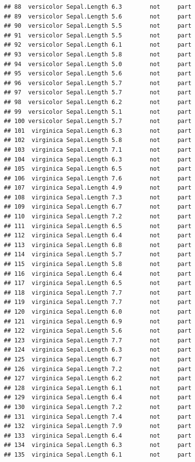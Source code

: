\documentclass[krantz2]{krantz}\usepackage{knitr}%
\begin{document}
\begin{knitrout}
\begin{kframe}
\begin{verbatim}
## 88  versicolor Sepal.Length 6.3        not     part
## 89  versicolor Sepal.Length 5.6        not     part
## 90  versicolor Sepal.Length 5.5        not     part
## 91  versicolor Sepal.Length 5.5        not     part
## 92  versicolor Sepal.Length 6.1        not     part
## 93  versicolor Sepal.Length 5.8        not     part
## 94  versicolor Sepal.Length 5.0        not     part
## 95  versicolor Sepal.Length 5.6        not     part
## 96  versicolor Sepal.Length 5.7        not     part
## 97  versicolor Sepal.Length 5.7        not     part
## 98  versicolor Sepal.Length 6.2        not     part
## 99  versicolor Sepal.Length 5.1        not     part
## 100 versicolor Sepal.Length 5.7        not     part
## 101  virginica Sepal.Length 6.3        not     part
## 102  virginica Sepal.Length 5.8        not     part
## 103  virginica Sepal.Length 7.1        not     part
## 104  virginica Sepal.Length 6.3        not     part
## 105  virginica Sepal.Length 6.5        not     part
## 106  virginica Sepal.Length 7.6        not     part
## 107  virginica Sepal.Length 4.9        not     part
## 108  virginica Sepal.Length 7.3        not     part
## 109  virginica Sepal.Length 6.7        not     part
## 110  virginica Sepal.Length 7.2        not     part
## 111  virginica Sepal.Length 6.5        not     part
## 112  virginica Sepal.Length 6.4        not     part
## 113  virginica Sepal.Length 6.8        not     part
## 114  virginica Sepal.Length 5.7        not     part
## 115  virginica Sepal.Length 5.8        not     part
## 116  virginica Sepal.Length 6.4        not     part
## 117  virginica Sepal.Length 6.5        not     part
## 118  virginica Sepal.Length 7.7        not     part
## 119  virginica Sepal.Length 7.7        not     part
## 120  virginica Sepal.Length 6.0        not     part
## 121  virginica Sepal.Length 6.9        not     part
## 122  virginica Sepal.Length 5.6        not     part
## 123  virginica Sepal.Length 7.7        not     part
## 124  virginica Sepal.Length 6.3        not     part
## 125  virginica Sepal.Length 6.7        not     part
## 126  virginica Sepal.Length 7.2        not     part
## 127  virginica Sepal.Length 6.2        not     part
## 128  virginica Sepal.Length 6.1        not     part
## 129  virginica Sepal.Length 6.4        not     part
## 130  virginica Sepal.Length 7.2        not     part
## 131  virginica Sepal.Length 7.4        not     part
## 132  virginica Sepal.Length 7.9        not     part
## 133  virginica Sepal.Length 6.4        not     part
## 134  virginica Sepal.Length 6.3        not     part
## 135  virginica Sepal.Length 6.1        not     part

\end{verbatim}
\end{kframe}
\end{knitrout}
\end{document}
